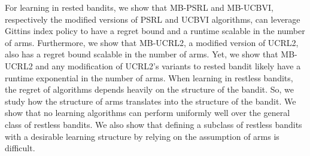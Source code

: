 For learning in rested bandits, we show that MB-PSRL and MB-UCBVI, respectively the modified versions of PSRL and UCBVI algorithms, can leverage Gittins index policy to have a regret bound and a runtime scalable in the number of arms. Furthermore, we show that MB-UCRL2, a modified version of UCRL2, also has a regret bound scalable in the number of arms. Yet, we show that MB-UCRL2 and any modification of UCRL2’s variants to rested bandit likely have a runtime exponential in the number of arms.
When learning in restless bandits, the regret of algorithms depends heavily on the structure of the bandit.
So, we study how the structure of arms translates into the structure of the bandit. We show that no learning algorithms can perform uniformly well over the general class of restless bandits. We also show that defining a subclass of restless bandits with a desirable learning structure by relying on the assumption of arms is difficult.

